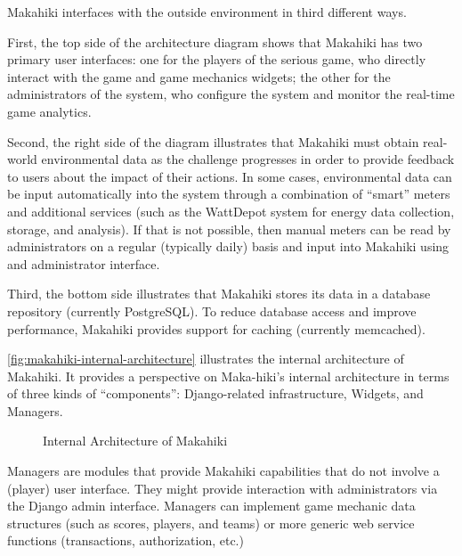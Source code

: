 Makahiki interfaces with the outside environment in third different ways.

First, the top side of the architecture diagram shows that Makahiki has two primary user interfaces: one for the players of the serious game, who directly interact with the game and game mechanics widgets; the other for the administrators of the system, who configure the system and monitor the real-time game analytics.

Second, the right side of the diagram illustrates that Makahiki must obtain real-world environmental data as the challenge progresses in order to provide feedback to users about the impact of their actions. In some cases, environmental data can be input automatically into the system through a combination of ``smart'' meters and additional services (such as the WattDepot system for energy data collection, storage, and analysis). If that is not possible, then manual meters can be read by administrators on a regular (typically daily) basis and input into Makahiki using and administrator interface.

Third, the bottom side illustrates that Makahiki stores its data in a database repository (currently PostgreSQL). To reduce database access and improve performance, Makahiki provides support for caching (currently memcached).

\autoref{fig:makahiki-internal-architecture} illustrates the internal architecture of Makahiki. It provides a perspective on Maka-hiki's internal architecture in terms of three kinds of ``components'': Django-related infrastructure, Widgets, and Managers.

\begin{figure}[!ht]
\begin{center}
\end{center}
\caption{Internal Architecture of Makahiki}
\label{fig:makahiki-internal-architecture}
\end{figure}

Managers are modules that provide Makahiki capabilities that do not involve a (player) user interface. They might provide interaction with administrators via the Django admin interface. Managers can implement game mechanic data structures (such as scores, players, and teams) or more generic web service functions (transactions, authorization, etc.)

